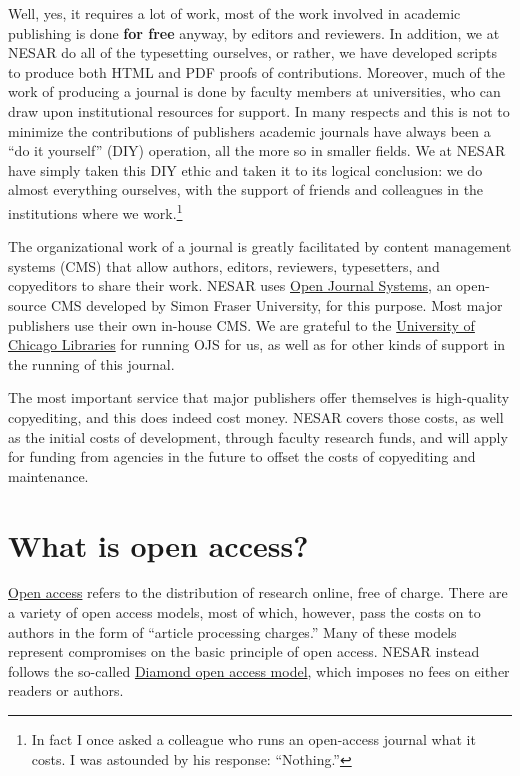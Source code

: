 Well, yes, it requires a lot of work, most of the work involved in academic publishing is done \textbf{for free} anyway, by editors and reviewers. In addition, we at NESAR do all of the typesetting ourselves, or rather, we have developed scripts to produce both HTML and PDF proofs of contributions. Moreover, much of the work of producing a journal is done by faculty members at universities, who can draw upon institutional resources for support. In many respects \Dash and this is not to minimize the contributions of publishers \Dash academic journals have always been a “do it yourself” (DIY) operation, all the more so in smaller fields. We at NESAR have simply taken this DIY ethic and taken it to its logical conclusion: we do almost everything ourselves, with the support of friends and colleagues in the institutions where we work.\footnote{%
      In fact I once asked a colleague who runs an open-access journal what it costs. I was astounded by his response: “Nothing.” 
}

The organizational work of a journal is greatly facilitated by content management systems (CMS) that allow authors, editors, reviewers, typesetters, and copyeditors to share their work. NESAR uses \href{https://pkp.sfu.ca/ojs/}{Open Journal Systems}, an open-source CMS developed by Simon Fraser University, for this purpose. Most major publishers use their own in-house CMS. We are grateful to the \href{https://www.lib.uchicago.edu/}{University of Chicago Libraries} for running OJS for us, as well as for other kinds of support in the running of this journal.

The most important service that major publishers offer themselves is high-quality copyediting, and this does indeed cost money. NESAR covers those costs, as well as the initial costs of development, through faculty research funds, and will apply for funding from agencies in the future to offset the costs of copyediting and maintenance.

\section{What is open access?}\label{h2ni9pkdxmw8}
      \href{https://en.wikipedia.org/wiki/Open_access}{Open access} refers to the distribution of research online, free of charge. There are a variety of open access models, most of which, however, pass the costs on to authors in the form of “article processing charges.” Many of these models represent compromises on the basic principle of open access. NESAR instead follows the so-called \href{https://en.wikipedia.org/wiki/Diamond_open_access}{Diamond open access model}, which imposes no fees on either readers or authors.

